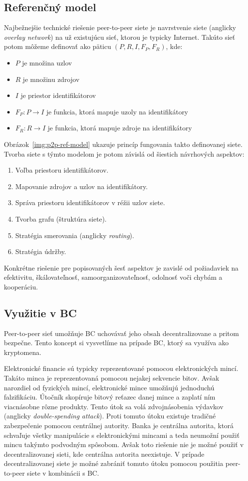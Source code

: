 \subsection{Referenčný model}
Najbežnejšie technické riešenie peer-to-peer siete je navrstvenie siete (anglicky \textit{overlay network}) na už existujúcu sieť, ktorou je typicky Internet. Takúto sieť potom môžeme definovať ako päticu $(P,R,I,F_P,F_R)$, kde:
\begin{itemize}
	\item $P$ je množina uzlov
	\item $R$ je množinu zdrojov
	\item $I$ je priestor identifikátorov
	\item $F_P: P \rightarrow I$ je funkcia, ktorá mapuje uzoly na identifikátory
	\item $F_R: R \rightarrow I$ je funkcia, ktorá mapuje zdroje na identifikátory
\end{itemize}

Obrázok~\ref{img:p2p-ref-model} ukazuje princíp fungovania takto definovanej siete. Tvorba siete s týmto modelom je potom závislá od šiestich návrhových aspektov:
\begin{enumerate}
	\item Voľba priestoru identifikátorov.
	\item Mapovanie zdrojov a uzlov na identifikátory.
	\item Správa priestoru identifikátorov v réžii uzlov siete.
	\item Tvorba grafu (štruktúra siete).
	\item Stratégia smerovania (anglicky \textit{routing}).
	\item Stratégia údržby.
\end{enumerate}
Konkrétne riešenie pre popisovaných šesť aspektov je zavislé od požiadaviek na efektivitu, škálovateľnosť, samoorganizovateľnosť, odolnosť voči chybám a kooperáciu.~\cite{p2pEssence}

\subsection{Využitie v BC}

Peer-to-peer sieť umožňuje BC uchovávať jeho obsah decentralizovane a pritom bezpečne. Tento koncept si vysvetlíme na prípade BC, ktorý sa využíva ako kryptomena.

Elektronické financie sú typicky reprezentované pomocou elektronických mincí. Takáto minca je reprezentovaná pomocou nejakej sekvencie bitov. Avšak narozdiel od fyzických mincí, elektronické mince umožňujú jednoduchú falzifikáciu. Útočník skopíruje bitový reťazec danej mince a zaplatí ním viacnásobne rôzne produkty. Tento útok sa volá zdvojnásobenia výdavkov (anglicky \textit{double-spending attack}). Proti tomuto útoku existuje tradičné zabezpečenie pomocou centrálnej autority. Banka je centrálna autorita, ktorá schvaľuje všetky manipulácie s elektronickými mincami a teda neumožní použiť mincu takýmto podvodným spôsobom. Avšak toto riešenie nie je možné použiť v decentralizovanej sieti, kde centrálna autorita neexistuje. V prípade decentralizovanej siete je možné zabrániť tomuto útoku pomocou použitia peer-to-peer siete v kombinácii s BC.~\cite{doubleSpending}

